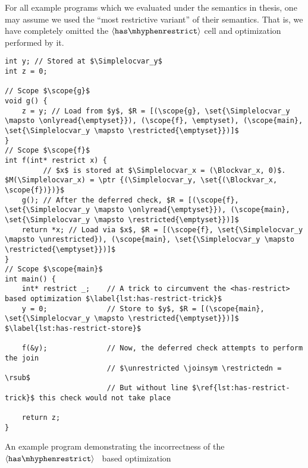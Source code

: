 For all example programs which we evaluated under the \cink{} semantics in thesis,
one may assume we used the ``most restrictive variant'' of their semantics.
That is, we have completely omitted the $\mathtt{\langle has\mhyphen restrict \rangle}$ cell
and optimization performed by it.

\begin{code}
\begin{verbatim}
int y; // Stored at $\Simplelocvar_y$
int z = 0;

// Scope $\scope{g}$
void g() {
    z = y; // Load from $y$, $R = [(\scope{g}, \set{\Simplelocvar_y \mapsto \onlyread{\emptyset}}), (\scope{f}, \emptyset), (\scope{main}, \set{\Simplelocvar_y \mapsto \restricted{\emptyset}})]$
}
// Scope $\scope{f}$
int f(int* restrict x) {
         // $x$ is stored at $\Simplelocvar_x = (\Blockvar_x, 0)$. $M(\Simplelocvar_x) = \ptr {(\Simplelocvar_y, \set{(\Blockvar_x, \scope{f})})}$
    g(); // After the deferred check, $R = [(\scope{f}, \set{\Simplelocvar_y \mapsto \onlyread{\emptyset}}), (\scope{main}, \set{\Simplelocvar_y \mapsto \restricted{\emptyset}})]$
    return *x; // Load via $x$, $R = [(\scope{f}, \set{\Simplelocvar_y \mapsto \unrestricted}), (\scope{main}, \set{\Simplelocvar_y \mapsto \restricted{\emptyset}})]$
}
// Scope $\scope{main}$
int main() {
    int* restrict _;    // A trick to circumvent the <has-restrict> based optimization $\label{lst:has-restrict-trick}$
    y = 0;              // Store to $y$, $R = [(\scope{main}, \set{\Simplelocvar_y \mapsto \restricted{\emptyset}})]$ $\label{lst:has-restrict-store}$

    f(&y);              // Now, the deferred check attempts to perform the join
                        // $\unrestricted \joinsym \restrictedn = \rsub$
                        // But without line $\ref{lst:has-restrict-trick}$ this check would not take place 

    return z;
}
\end{verbatim}
\caption{An example program demonstrating the incorrectness of the $\mathtt{\langle has\mhyphen restrict \rangle}$ \ based optimization}
\label{lst:example-incorrect-optimization}
\end{code}

\newpage

